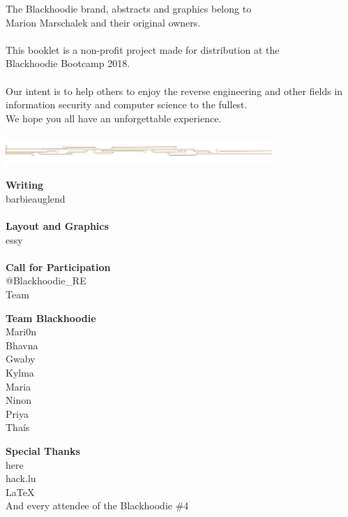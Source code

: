 \def\pagetitletext{}

\thispagestyle{empty}

\vspace*{\fill}
\begin{center}\footnotesize
The Blackhoodie brand, abstracts and graphics belong to\\Marion Marschalek and their original owners.\\
~\\
This booklet is a non-profit project made for distribution at the\\Blackhoodie Bootcamp 2018.\\
~\\
Our intent is to help others to enjoy the reverse engineering and other fields in information security and computer science to the fullest.\\We hope you all have an unforgettable experience.\\
~\\
\includegraphics[height=10mm,keepaspectratio]{images/blackhoodie_div.pdf}
\end{center}
\begin{multicols}{3}\footnotesize
\setlength{\columnseprule}{0pt}
\begin{center}
\textbf{Writing}\\barbieauglend\\
~\\
\textbf{Layout and Graphics}\\essy\\
~\\
\textbf{Call for Participation}\\@Blackhoodie\_RE\\Team
\end{center}
\columnbreak
\begin{center}
\textbf{Team Blackhoodie}\\Mari0n\\Bhavna\\Gwaby\\Kylma\\Maria\\Ninon\\Priya\\Thaís\\
\end{center}
\columnbreak
\begin{center}
\textbf{Special Thanks}\\here\\hack.lu\\LaTeX\\And every attendee of the Blackhoodie \#4
\end{center}
\end{multicols}
\vspace{-6em}
